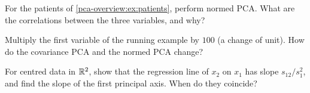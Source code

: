 \begin{notechapter}
\begin{exercise}\label{pca-overview:exr:2}
For the patients of \cref{pca-overview:ex:patients}, perform normed PCA. What are the correlations
between the three variables, and why?
\end{exercise}

\begin{exercise}\label{pca-overview:exr:3}
Multiply the first variable of the running example by $100$ (a change of unit). How do the
covariance PCA and the normed PCA change?
\end{exercise}

\begin{exercise}\label{pca-overview:exr:4}
For centred data in $\mathbb{R}^2$, show that the regression line of $x_2$ on $x_1$ has slope $s_{12}/s_1^2$,
and find the slope of the first principal axis. When do they coincide?
\end{exercise}
\end{notechapter}
